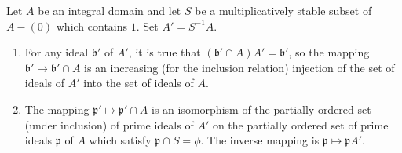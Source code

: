 \begin{proposition}
\label{prop:V.1.1}
Let $A$ be an integral domain and let $S$ be a multiplicatively stable
subset of $A-(0)$ which contains $1$. Set $A'=S^{-1}A$.
\begin{enumerate}[label=(\arabic*),leftmargin=2.0em,itemsep=0.1ex,topsep=0.3ex]
\item\label{prop:V.1.1.1} For any ideal $\mathfrak{b}'$ of $A'$, it is true that
$(\mathfrak{b}'\cap A)A'=\mathfrak{b}'$, so the mapping
$\mathfrak{b}'\mapsto\mathfrak{b}'\cap A$ is an increasing (for the inclusion
relation) injection of the set of ideals of $A'$ into the set of ideals of
$A$.
\item\label{prop:V.1.1.2} The mapping $\mathfrak{p}'\mapsto\mathfrak{p}'\cap A$ is an isomorphism
of the partially ordered set (under inclusion) of prime ideals of $A'$ on the
partially ordered set of prime ideals $\mathfrak{p}$ of $A$ which satisfy
$\mathfrak{p}\cap S=\phi$. The inverse mapping is
$\mathfrak{p}\mapsto\mathfrak{p}A'$.
\end{enumerate}
\end{proposition}

